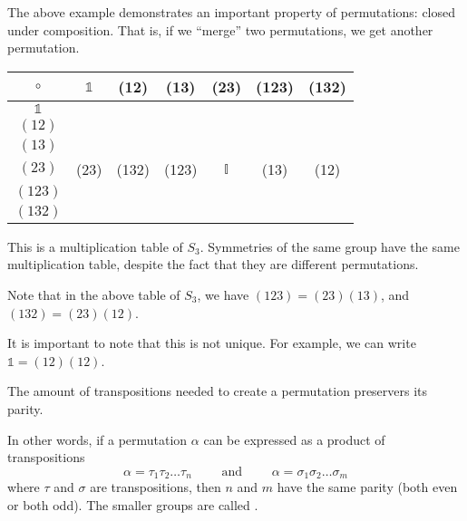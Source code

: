 The above example demonstrates an important property of permutations: closed under composition. That is, if we ``merge'' two permutations, we get another permutation.

\newpage
\begin{table}[ht!]
    \centering
    \renewcommand{\arraystretch}{1.25}
    \begin{tabular}{c|c|c|c|c|c|c}
        $\circ$ & $\mathds{1}$ & (12) & (13) & (23) & (123) & (132) \\
        \hline
        $\mathds{1}$ & & & & & \\
        \hline
        $(12)$ & & & & & \\
        \hline
        $(13)$ & & & & & \\
        \hline
        $(23)$ & (23) & (132) & (123) & $\mathbb{I}$ & (13) & (12)\\
        \hline
        $(123)$ & & & & & \\
        \hline
        $(132)$ & & & & &
    \end{tabular}
\end{table}

This is a multiplication table of $S_3$. Symmetries of the same group have the same multiplication table, despite the fact that they are different permutations.

\begin{remark}
    Note that in the above table of $S_3$, we have $(1 2 3) = (2 3)(1 3)$, and $(1 3 2) = (2 3)(1 2)$.  

    It is important to note that this is not unique. For example, we can write $\mathds{1} = (12)(12)$. 
\end{remark}

\begin{theorem}
    The amount of transpositions needed to create a permutation preservers its parity.
\end{theorem}

In other words, if a permutation $\alpha$ can be expressed as a product of transpositions \[
    \alpha = \tau_1 \tau_2 \dots \tau_n \qquad \text{ and } \qquad \alpha = \sigma_1 \sigma_2 \dots \sigma_m
\] where $\tau$ and $\sigma$ are transpositions, then $n$ and $m$ have the same parity (both even or both odd). The smaller groups are called .